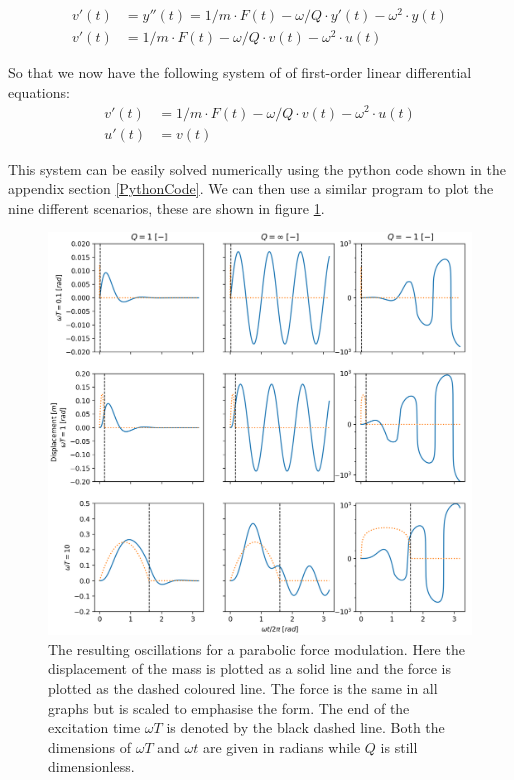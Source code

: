 \begin{align*}
    v'(t) &= y''(t) = 1/m \cdot F(t) - \omega/Q\cdot y'(t)-\omega^2\cdot y(t)\\
    v'(t) &= 1/m\cdot F(t) - \omega/Q\cdot v(t)-\omega^2\cdot u(t)
\end{align*}

So that we now have the following system of of first-order linear differential equations:\\
\vspace{-0.5cm}
\begin{align}
    v'(t) &= 1/m\cdot F(t)-\omega/Q\cdot v(t)- \omega^2\cdot u(t)\\
    u'(t) &= v(t)
\end{align}

This system can be easily solved numerically using the python code shown in the appendix section \ref{PythonCode}. We can then use a similar program to plot the nine different scenarios, these are shown in figure \ref{fig:fig_Q3}.\\

\vspace{-.5cm}
\begin{figure}[!h]
    \centering
    \includegraphics[width=.65\linewidth,keepaspectratio]{figures/Q3_omega_q_plot.png}
    \caption{The resulting oscillations for a parabolic force modulation. Here the displacement of the mass is plotted as a solid line and the force is plotted as the dashed coloured line. The force is the same in all graphs but is scaled to emphasise the form. The end of the excitation time $\omega T$ is denoted by the black dashed line. Both the dimensions of $\omega T$ and $\omega t$ are given in radians while $Q$ is still dimensionless. }
    \label{fig:fig_Q3}
\end{figure}


